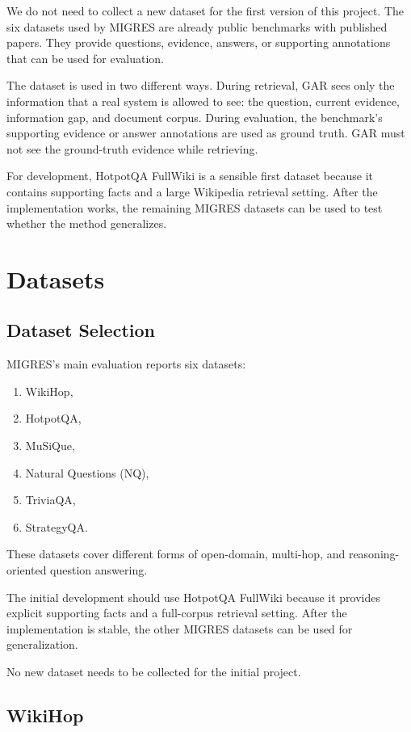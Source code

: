 \documentclass[11pt,a4paper]{article}
\begin{document}
We do not need to collect a new dataset for the first version of this project. The six datasets used by MIGRES are already public benchmarks with published papers. They provide questions, evidence, answers, or supporting annotations that can be used for evaluation.

The dataset is used in two different ways. During retrieval, GAR sees only the information that a real system is allowed to see: the question, current evidence, information gap, and document corpus. During evaluation, the benchmark's supporting evidence or answer annotations are used as ground truth. GAR must not see the ground-truth evidence while retrieving.

For development, HotpotQA FullWiki is a sensible first dataset because it contains supporting facts and a large Wikipedia retrieval setting. After the implementation works, the remaining MIGRES datasets can be used to test whether the method generalizes.


\section{Datasets}

\subsection{Dataset Selection}

MIGRES's main evaluation reports six datasets:

\begin{enumerate}[leftmargin=1.5em]
\item WikiHop,
\item HotpotQA,
\item MuSiQue,
\item Natural Questions (NQ),
\item TriviaQA,
\item StrategyQA.
\end{enumerate}

These datasets cover different forms of open-domain, multi-hop, and reasoning-oriented question answering.

The initial development should use HotpotQA FullWiki because it provides explicit supporting facts and a full-corpus retrieval setting. After the implementation is stable, the other MIGRES datasets can be used for generalization.

No new dataset needs to be collected for the initial project.

\subsection{WikiHop}
\end{document}
